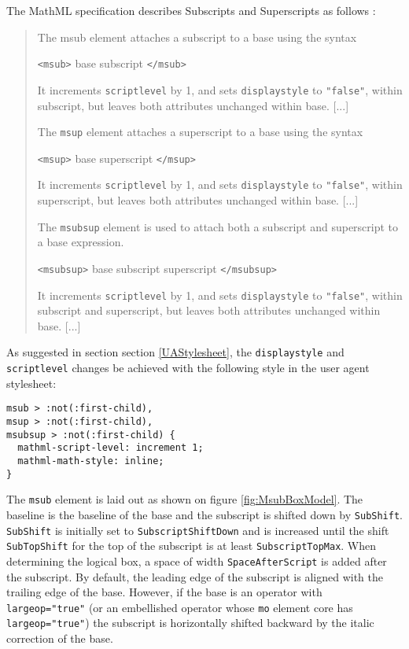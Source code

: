 The MathML specification describes Subscripts and Superscripts as
follows \cite{MathML3}:
%
\begin{quote}
The msub element attaches a subscript to a base using the syntax

  {\tt <msub>} base subscript {\tt </msub>}

It increments {\tt scriptlevel} by 1, and sets {\tt displaystyle} to
{\tt "false"}, within subscript, but leaves both attributes unchanged within
base. [...]

The {\tt msup} element attaches a superscript to a base using the syntax

  {\tt <msup>} base superscript {\tt </msup>}

It increments {\tt scriptlevel} by 1, and sets {\tt displaystyle} to
{\tt "false"}, within superscript, but leaves both attributes unchanged within
base. [...]

The {\tt msubsup} element is used to attach both a subscript and superscript to
a base expression.

  {\tt <msubsup>} base subscript superscript {\tt </msubsup>}

It increments {\tt scriptlevel} by 1, and sets {\tt displaystyle} to
{\tt "false"}, within subscript and superscript, but leaves both attributes
unchanged within base. [...]
\end{quote}
%

As suggested in section section \ref{UAStylesheet}, the {\tt displaystyle} and
{\tt scriptlevel} changes be achieved with the
following style in the user agent stylesheet:
%
\begin{lstlisting}
msub > :not(:first-child),
msup > :not(:first-child),
msubsup > :not(:first-child) {
  mathml-script-level: increment 1;
  mathml-math-style: inline;
}
\end{lstlisting}
%

The {\tt msub} element is laid out as shown on figure \ref{fig:MsubBoxModel}.
The baseline is the baseline of the base and the subscript is shifted down
by {\tt SubShift}. {\tt SubShift} is initially set to
{\tt SubscriptShiftDown}
and is increased until the shift {\tt SubTopShift} for the top of the subscript
is at least {\tt SubscriptTopMax}. When determining
the logical box, a space of width {\tt SpaceAfterScript}
is added after
the subscript. By default, the leading edge of the subscript is aligned with
the trailing edge of the base. However, if the base is an operator with
{\tt largeop="true"} (or an embellished operator whose {\tt mo} element core
has {\tt largeop="true"}) the subscript is horizontally shifted backward
by the italic correction of the base.

